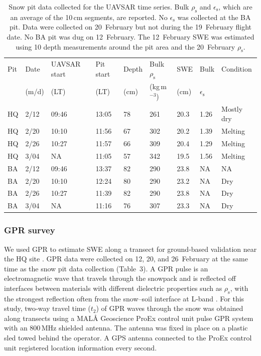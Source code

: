 \begin{table}[t]
\caption{Snow pit data collected for the UAVSAR time series. Bulk $\rho_\mathrm{s}$ and $\epsilon_\mathrm{s}$, which are an average of the 10\,cm segments, are reported. No $\epsilon_\mathrm{s}$ was collected at the BA pit. Data were collected on 20~February but not during the 19~February flight date. No BA pit was dug on 12~February. The 12~February SWE was estimated using 10 depth measurements around the pit area and the 20~February $\rho_\mathrm{s}$.}
\begin{tabular}{lllllllll}
\toprule
Pit & Date &   {UAVSAR start} & {Pit start} & Depth &  {Bulk $\rho_\mathrm{s}$} & SWE & Bulk & Condition \\
& (m/d) &(LT) &(LT) &(cm) &(kg\,m$^{-3}$) &(cm) &$\epsilon_\mathrm{s}$ & \\
\midrule
HQ & 2/12 & 09:46 & 13:05 & 78 & 261 & 20.3 & 1.26 & Mostly dry \\
HQ & 2/20 & 10:10 & 11:56 & 67 & 302 & 20.2 & 1.39 & Melting \\
HQ & 2/26 & 10:27 & 11:57 & 66 & 309 & 20.4 & 1.29 & Melting \\
HQ & 3/04 & NA   & 11:05 & 57 & 342 & 19.5 & 1.56 & Melting \\
BA & 2/12 & 09:46 & 13:37 & 82 & 290 & 23.8 & NA   & NA \\
BA & 2/20 & 10:10 & 12:24 & 80 & 290 & 23.2 & NA   & Dry \\
BA & 2/26 & 10:27 & 11:39 & 82 & 290 & 23.8 & NA   & Dry \\
BA & 3/04 & NA   & 11:16 & 76 & 307 & 23.3 & NA   & Dry \\
\bottomrule
\end{tabular}
\end{table}

\hypertarget{ch3-methods-9}{\subsubsection{GPR survey}\label{ch3-methods-9}}


We used GPR to estimate SWE along a transect for ground-based validation near the HQ site \citep{marshallEstimatingAlpineSnowpack2005, webbryanSnowEx20JemezUNM2020}. GPR data were collected on 12, 20, and 26~February at the same time as the snow pit data collection (Table~3). A GPR pulse is an electromagnetic wave that travels through the snowpack and is reflected off interfaces between materials with different dielectric properties such as $\rho_\mathrm{s}$, with the strongest reflection often from the snow--soil interface at L-band \citep{bradfordEstimatingPorosityGroundpenetrating2009, holbrookEstimatingSnowWater2016, webbUsingGroundPenetrating2017}. For this study, two‐way travel time ($t_2$) of GPR waves through the snow was obtained along transects using a MAL{\AA} Geoscience ProEx control unit pulse GPR system with an 800\,MHz shielded antenna. The antenna was fixed in place on a plastic sled towed behind the operator. A GPS antenna connected to the ProEx control unit registered location information every second.

